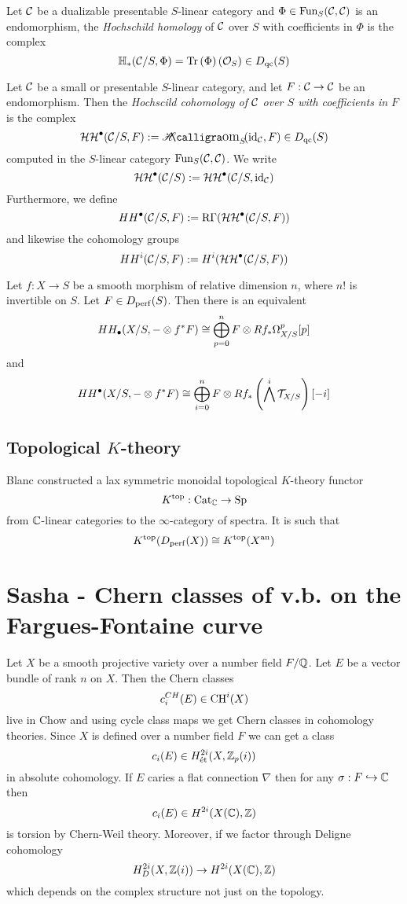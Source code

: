 \documentclass[12pt]{article}
\newcommand{\HH}{\mathbb{H}}
\newcommand{\R}{\mathrm{R}}
\begin{document}
\begin{defn}
Let $\mathcal{C}$ be a dualizable presentable $S$-linear category and $\Phi \in \mathrm{Fun}_{S}(\mathcal{C}, \mathcal{C})$ is an endomorphism, the \textit{Hochschild homology} of $\mathcal{C}$ over $S$ with coefficients in $\Phi$ is the complex
\[ \HH_*(\C/S, \Phi) = \Tr{\Phi}(\struct{S}) \in D_{\qc}(S) \]
\end{defn}

\begin{defn}
Let $\mathcal{C}$ be a small or presentable $S$-linear category, and let $F : \mathcal{C} \to \mathcal{C}$ be an endomorphism. Then the \textit{Hochscild cohomology of $\mathcal{C}$ over $S$ with coefficients in $F$} is the complex
\[ \cHH^\bullet(\C/S,F) := \shHom{S}{\id_{\C}}{F} \in D_{\qc}(S) \]
computed in the $S$-linear category $\mathrm{Fun}_{S}(\mathcal{C}, \mathcal{C})$. We write
\[ \mathcal{HH}^\bullet(\mathcal{C}/S) := \mathcal{HH}^\bullet(\mathcal{C}/S, \mathrm{id}_{\mathcal{C}}) \]
Furthermore, we define
\[ HH^\bullet(\C/S, F) := \R\Gamma(\cHH^\bullet(\C/S, F)) \]
and likewise the cohomology groups
\[ HH^i(\mathcal{C}/S, F) := H^i(\mathcal{HH}^\bullet(\mathcal{C}/S, F)) \]
\end{defn}

\begin{theorem}
Let $f : X \to S$ be a smooth morphism of relative dimension $n$, where $n!$ is invertible on $S$. Let $F \in D_{\mathrm{perf}}(S)$. Then there is an equivalent
\[ HH_\bullet(X/S, -\otimes f^* F) \cong \bigoplus_{p=0}^n F \otimes R f_* \Omega_{X/S}^p [p] \]
and
\[ HH^\bullet(X/S, -\otimes f^* F) \cong \bigoplus_{i = 0}^n F \otimes R f_* \left( \bigwedge^i \mathcal{T}_{X/S} \right) [-i] \]
\end{theorem}

\subsection{Topological $K$-theory}

\renewcommand{\top}{\mathrm{top}}
\newcommand{\Cat}{\mathrm{Cat}}

Blanc constructed a lax symmetric monoidal topological $K$-theory functor
\[ K^{\top} : \Cat_{\CC} \to \Sp \]
from $\mathbb{C}$-linear categories to the $\infty$-category of spectra. It is such that
\[ K^{\top}(D_{\perf}(X)) \cong K^{\top}(X^{\an}) \]

\section{Sasha - Chern classes of v.b. on the Fargues-Fontaine curve}

Let $X$ be a smooth projective variety over a number field $F / \mathbb{Q}$. Let $E$ be a vector bundle of rank $n$ on $X$. Then the Chern classes
\[ c_i^{CH}(E) \in \mathrm{CH}^i(X) \]
live in Chow and using cycle class maps we get Chern classes in cohomology theories. Since $X$ is defined over a number field $F$ we can get a class
\[ c_i(E) \in H^{2i}_{\text{\'{e}t}}(X, \mathbb{Z}_p(i)) \]
in absolute \etale cohomology. If $E$ caries a flat connection $\nabla$ then for any $\sigma : F \hookrightarrow \mathbb{C}$ then
\[ c_i(E) \in H^{2i}(X(\mathbb{C}), \mathbb{Z}) \]
is torsion by Chern-Weil theory. Moreover, if we factor through Deligne cohomology
\[ H_D^{2i}(X, \mathbb{Z}(i)) \to H^{2i}(X(\mathbb{C}), \mathbb{Z}) \]
which depends on the complex structure not just on the topology. 
\end{document}
